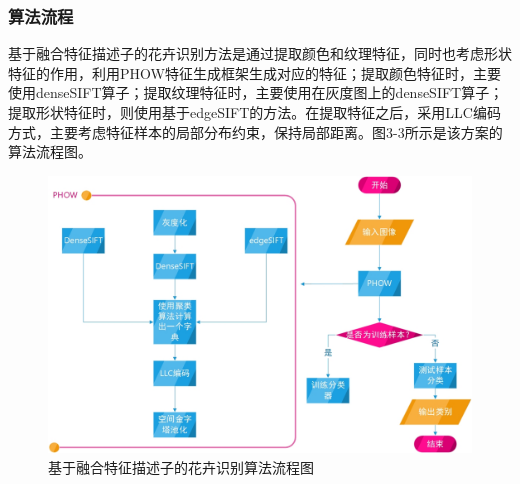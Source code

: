 \documentclass[supercite]{HustGraduPaper}
\begin{document}
\begin{sloppypar}
  \subsubsection{算法流程}
  基于融合特征描述子的花卉识别方法是通过提取颜色和纹理特征，同时也考虑形状特征的作用，利用PHOW特征生成框架生成对应的特征；提取颜色特征时，主要使用denseSIFT算子；提取纹理特征时，主要使用在灰度图上的denseSIFT算子；提取形状特征时，则使用基于edgeSIFT的方法。在提取特征之后，采用LLC编码方式，主要考虑特征样本的局部分布约束，保持局部距离。图3-3所示是该方案的算法流程图。\begin{figure}[H]
    \setlength{\abovecaptionskip}{0.2cm}
    \setlength{\belowcaptionskip}{-0.cm}
      \centering%
      \includegraphics[scale=0.55]{23.jpg}
      \caption{基于融合特征描述子的花卉识别算法流程图}
    \end{figure}

\end{sloppypar}
\end{document}
